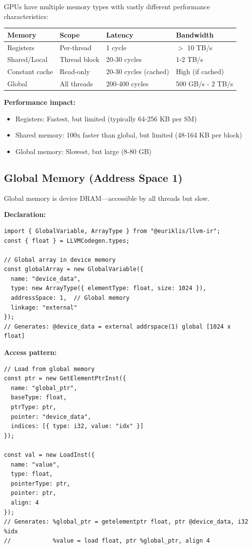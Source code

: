 \documentclass[11pt]{article}
\begin{document}
GPUs have multiple memory types with vastly different performance characteristics:

\begin{center}
\begin{tabular}{|l|l|l|l|}
\hline
\textbf{Memory} & \textbf{Scope} & \textbf{Latency} & \textbf{Bandwidth} \\
\hline
Registers & Per-thread & 1 cycle & $>$ 10 TB/s \\
Shared/Local & Thread block & 20-30 cycles & 1-2 TB/s \\
Constant cache & Read-only & 20-30 cycles (cached) & High (if cached) \\
Global & All threads & 200-400 cycles & 500 GB/s - 2 TB/s \\
\hline
\end{tabular}
\end{center}

\textbf{Performance impact:}
\begin{itemize}[noitemsep]
  \item Registers: Fastest, but limited (typically 64-256 KB per SM)
  \item Shared memory: 100x faster than global, but limited (48-164 KB per block)
  \item Global memory: Slowest, but large (8-80 GB)
\end{itemize}

\subsection{Global Memory (Address Space 1)}

Global memory is device DRAM—accessible by all threads but slow.

\textbf{Declaration:}
\begin{lstlisting}[style=ts]
import { GlobalVariable, ArrayType } from "@euriklis/llvm-ir";
const { float } = LLVMCodegen.types;

// Global array in device memory
const globalArray = new GlobalVariable({
  name: "device_data",
  type: new ArrayType({ elementType: float, size: 1024 }),
  addressSpace: 1,  // Global memory
  linkage: "external"
});
// Generates: @device_data = external addrspace(1) global [1024 x float]
\end{lstlisting}

\textbf{Access pattern:}
\begin{lstlisting}[style=ts]
// Load from global memory
const ptr = new GetElementPtrInst({
  name: "global_ptr",
  baseType: float,
  ptrType: ptr,
  pointer: "device_data",
  indices: [{ type: i32, value: "idx" }]
});

const val = new LoadInst({
  name: "value",
  type: float,
  pointerType: ptr,
  pointer: ptr,
  align: 4
});
// Generates: %global_ptr = getelementptr float, ptr @device_data, i32 %idx
//            %value = load float, ptr %global_ptr, align 4
\end{lstlisting}
\end{document}
